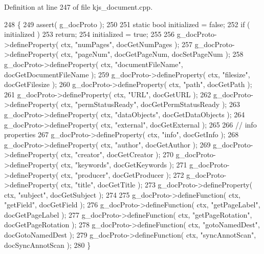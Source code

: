 Definition at line 247 of file kjs\+\_\+document.\+cpp.


\begin{DoxyCode}
248 \{
249     assert( g\_docProto );
250 
251     \textcolor{keyword}{static} \textcolor{keywordtype}{bool} initialized = \textcolor{keyword}{false};
252     \textcolor{keywordflow}{if} ( initialized )
253         \textcolor{keywordflow}{return};
254     initialized = \textcolor{keyword}{true};
255 
256     g\_docProto->defineProperty( ctx, \textcolor{stringliteral}{"numPages"}, docGetNumPages );
257     g\_docProto->defineProperty( ctx, \textcolor{stringliteral}{"pageNum"}, docGetPageNum, docSetPageNum );
258     g\_docProto->defineProperty( ctx, \textcolor{stringliteral}{"documentFileName"}, docGetDocumentFileName );
259     g\_docProto->defineProperty( ctx, \textcolor{stringliteral}{"filesize"}, docGetFilesize );
260     g\_docProto->defineProperty( ctx, \textcolor{stringliteral}{"path"}, docGetPath );
261     g\_docProto->defineProperty( ctx, \textcolor{stringliteral}{"URL"}, docGetURL );
262     g\_docProto->defineProperty( ctx, \textcolor{stringliteral}{"permStatusReady"}, docGetPermStatusReady );
263     g\_docProto->defineProperty( ctx, \textcolor{stringliteral}{"dataObjects"}, docGetDataObjects );
264     g\_docProto->defineProperty( ctx, \textcolor{stringliteral}{"external"}, docGetExternal );
265 
266     \textcolor{comment}{// info properties}
267     g\_docProto->defineProperty( ctx, \textcolor{stringliteral}{"info"}, docGetInfo );
268     g\_docProto->defineProperty( ctx, \textcolor{stringliteral}{"author"}, docGetAuthor );
269     g\_docProto->defineProperty( ctx, \textcolor{stringliteral}{"creator"}, docGetCreator );
270     g\_docProto->defineProperty( ctx, \textcolor{stringliteral}{"keywords"}, docGetKeywords );
271     g\_docProto->defineProperty( ctx, \textcolor{stringliteral}{"producer"}, docGetProducer );
272     g\_docProto->defineProperty( ctx, \textcolor{stringliteral}{"title"}, docGetTitle );
273     g\_docProto->defineProperty( ctx, \textcolor{stringliteral}{"subject"}, docGetSubject );
274 
275     g\_docProto->defineFunction( ctx, \textcolor{stringliteral}{"getField"}, docGetField );
276     g\_docProto->defineFunction( ctx, \textcolor{stringliteral}{"getPageLabel"}, docGetPageLabel );
277     g\_docProto->defineFunction( ctx, \textcolor{stringliteral}{"getPageRotation"}, docGetPageRotation );
278     g\_docProto->defineFunction( ctx, \textcolor{stringliteral}{"gotoNamedDest"}, docGotoNamedDest );
279     g\_docProto->defineFunction( ctx, \textcolor{stringliteral}{"syncAnnotScan"}, docSyncAnnotScan );
280 \}
\end{DoxyCode}

